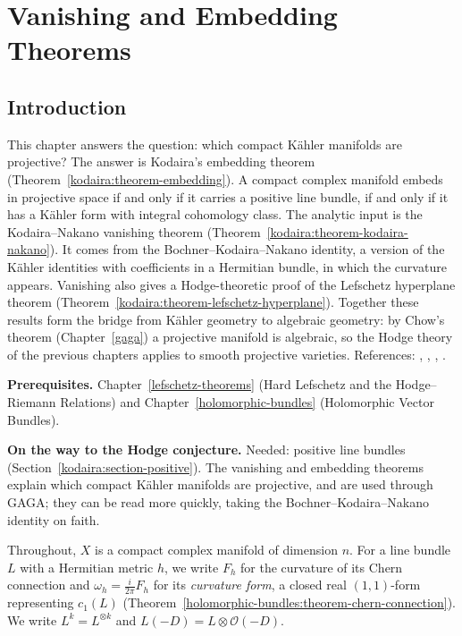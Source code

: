 \chapter{Vanishing and Embedding Theorems}\label{kodaira}

\section{Introduction}\label{kodaira:section-introduction}

This chapter answers the question: which compact K\"ahler manifolds are projective? The answer is Kodaira's embedding theorem
(Theorem~\ref{kodaira:theorem-embedding}). A compact complex manifold embeds in projective space if and only if it carries a positive line
bundle, if and only if it has a K\"ahler form with integral cohomology class. The analytic input is the Kodaira--Nakano vanishing theorem
(Theorem~\ref{kodaira:theorem-kodaira-nakano}). It comes from the Bochner--Kodaira--Nakano identity, a version of the K\"ahler identities
with coefficients in a Hermitian bundle, in which the curvature appears. Vanishing also gives a Hodge-theoretic proof of the Lefschetz
hyperplane theorem (Theorem~\ref{kodaira:theorem-lefschetz-hyperplane}). Together these results form the bridge from K\"ahler geometry to
algebraic geometry: by Chow's theorem (Chapter~\ref{gaga}) a projective manifold is algebraic, so the Hodge theory of the previous
chapters applies to smooth projective varieties. References: \cite[Chapter 1, Sections 2--4]{griffiths-harris}, \cite[Chapter 5]{huybrechts-complex},
\cite[Chapter 7]{voisin-hodge-1}, \cite{kodaira-1954}.

\noindent\textbf{Prerequisites.} Chapter~\ref{lefschetz-theorems} (Hard Lefschetz and the Hodge--Riemann Relations) and
Chapter~\ref{holomorphic-bundles} (Holomorphic Vector Bundles).

\noindent\textbf{On the way to the Hodge conjecture.} Needed: positive line bundles (Section~\ref{kodaira:section-positive}). The vanishing and embedding theorems explain which compact K\"ahler manifolds are projective, and
are used through GAGA; they can be read more quickly, taking the Bochner--Kodaira--Nakano identity on faith.

Throughout, $X$ is a compact complex manifold of dimension $n$. For a line bundle $L$ with a Hermitian metric $h$, we write $F_h$ for the
curvature of its Chern connection and $\omega_h = \frac{i}{2\pi}F_h$ for its \emph{curvature form}, a closed real $(1,1)$-form representing
$c_1(L)$ (Theorem~\ref{holomorphic-bundles:theorem-chern-connection}). We write $L^k = L^{\otimes k}$ and $L(-D) = L \otimes \mathcal{O}(-D)$.

